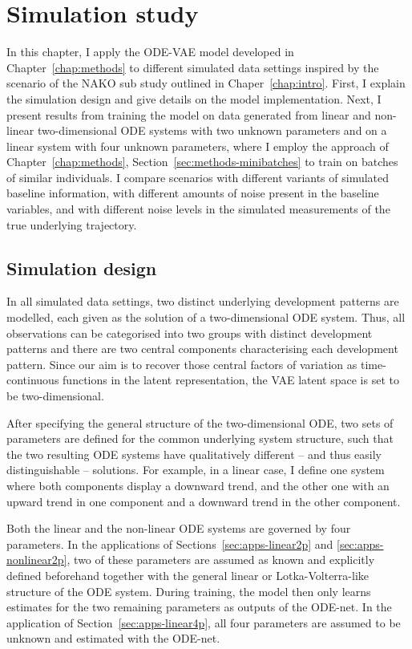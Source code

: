 \chapter{Simulation study}\label{chap:applications}
\fancyhead[LO]{\nouppercase{\leftmark}}
In this chapter, I apply the ODE-VAE model developed in Chapter~\ref{chap:methods} to different simulated data settings inspired by the scenario of the NAKO sub study outlined in Chaper~\ref{chap:intro}. First, I explain the simulation design and give details on the model implementation. 
Next, I present results from training the model on data generated from linear and non-linear two-dimensional ODE systems with two unknown parameters and on a linear system with four unknown parameters, where I employ the approach of Chapter~\ref{chap:methods}, Section~\ref{sec:methods-minibatches} to train on batches of similar individuals. I compare scenarios with different variants of simulated baseline information, with different amounts of noise present in the baseline variables, and with different noise levels in the simulated measurements of the true underlying trajectory. 

\section{Simulation design}

In all simulated data settings, two distinct underlying development patterns are modelled, each given as the solution of a two-dimensional ODE system. Thus, all observations can be categorised into two groups with distinct development patterns and there are two central components characterising each development pattern. 
Since our aim is to recover those central factors of variation as time-continuous functions in the latent representation, the VAE latent space is set to be two-dimensional. 

After specifying the general structure of the two-dimensional ODE, two sets of parameters are defined for the common underlying system structure, such that the two resulting ODE systems have qualitatively different -- and thus easily distinguishable -- solutions. For example, in a linear case, I define one system where both components display a downward trend, and the other one with an upward trend in one component and a downward trend in the other component. 

Both the linear and the non-linear ODE systems are governed by four parameters. In the applications of Sections~\ref{sec:apps-linear2p} and \ref{sec:apps-nonlinear2p}, two of these parameters are assumed as known and explicitly defined beforehand together with the general linear or Lotka-Volterra-like structure of the ODE system. During training, the model then only learns estimates for the two remaining parameters as outputs of the ODE-net. In the application of Section~\ref{sec:apps-linear4p}, all four parameters are assumed to be unknown and estimated with the ODE-net.

